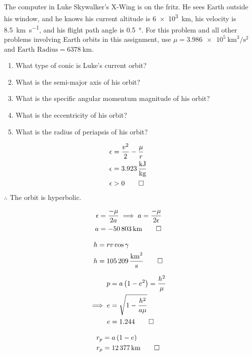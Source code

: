 \begin{hwkProblem}{3}{}
	
	The computer in Luke Skywalker's X-Wing is on the fritz. He sees Earth outside his window, and he knows his current altitude is \qty{6e3}{\km}, his velocity is \qty{8.5}{\km\per\s}, and his flight path angle is \qty{0.5}{\degree}. For this problem and all other problems involving Earth orbits in this assignment, use \( \mu = \qty{3.986e5}{\cubic\km\per\square\s} \) and \( \text{Earth Radius} = \qty{6378}{\km} \).
	\begin{enumerate}
		\item What type of conic is Luke's current orbit?
		\item What is the semi-major axis of his orbit?
		\item What is the specific angular momentum magnitude of his orbit?
		\item What is the eccentricity of his orbit?
		\item What is the radius of periapsis of his orbit?
	\end{enumerate}
	
	\hwkSol

	\hwkPart
	\begin{align*}
		\epsilon & = \frac{v^2}{2} - \frac{\mu}{r} \\
		\epsilon & = \qty{3.923}{\kJ\per\kg} \\
		\epsilon & > 0 \qed
	\end{align*}
	\( \therefore \) The orbit is hyperbolic.

	\hwkPart
	\begin{align*}
		\epsilon & = \frac{-\mu}{2a} \implies a = \frac{-\mu}{2\epsilon} \\
		a & = \qty{-50803}{\km} \qed
	\end{align*}

	\hwkPart
	\begin{align*}
		h & = rv\cos{\gamma} \\
		h & = \qty{105209}{\square\km\per\s} \qed
	\end{align*}

	\hwkPart
	\begin{align*}
		p & = a \left( 1 - e^2 \right) = \frac{h^2}{\mu} \\
		\implies e & = \sqrt{1 - \frac{h^2}{a \mu}} \\
		e & = 1.244 \qed
	\end{align*}

	\hwkPart
	\begin{align*}
		r_p & = a \left( 1 - e \right) \\
		r_p & = \qty{12377}{\km} \qed
	\end{align*}
	
\end{hwkProblem}

